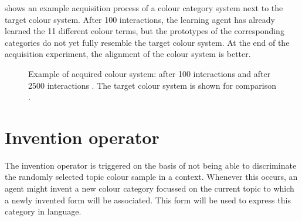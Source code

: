  shows an example
acquisition process of a colour category system next to the target
colour system. After 100 interactions, the learning agent has already
learned the 11 different colour terms, but the prototypes of the
corresponding categories do not yet fully resemble the target colour
system. At the end of the acquisition experiment, the alignment of the
colour system is better.

\begin{figure}[htbp]
\centering
{}
\caption[Example of an acquired and target colour system]{Example of
  acquired colour system: after 100 interactions
   and after 2500
  interactions . The target
  colour system is shown for comparison
  .}
\label{f:basic-strategy-acquisition-lexicon}
\end{figure}

\section{Invention operator}
\label{s:bcs-invention-operators}

The invention operator
is triggered on the basis of not being able
to discriminate the randomly selected topic colour sample in a
context. Whenever this occurs, an agent might invent a new colour
category focussed on the current topic to which a newly invented form
will be associated. This form will be used to express this category in
language.

